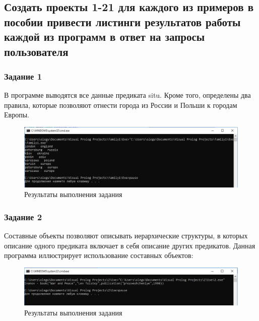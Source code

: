 \documentclass[14pt,a4paper,report]{report}
\begin{document}
\subsection{Создать проекты 1-21 для каждого из примеров в пособии привести листинги результатов работы каждой из программ в ответ на запросы пользователя}

\subsubsection{Задание 1}

В программе выводятся все данные предиката situ. Кроме того, определены два правила, которые позволяют отнести города из России и Польши к городам Европы. 



\begin{figure}[h!]
	\centering
	\includegraphics[scale = 0.9]{images/d1.png}
	\caption{Результаты выполнения задания}
\end{figure}

\clearpage

\subsubsection{Задание 2}

Составные объекты позволяют описывать иерархические структуры, в которых описание одного предиката включает в себя описание других предикатов. Данная программа иллюстрирует использование составных объектов:



\begin{figure}[h!]
	\centering
	\includegraphics[scale = 0.9]{images/d2.png}
	\caption{Результаты выполнения задания}
\end{figure}
\clearpage
\end{document}
